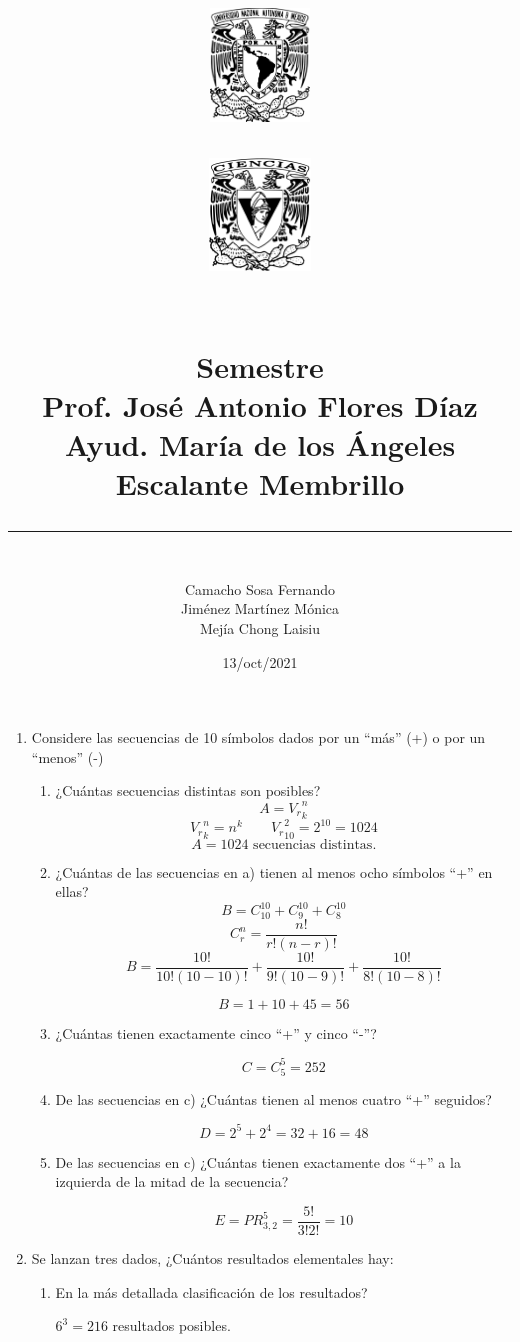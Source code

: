 \documentclass[letterpaper,11pt]{article}
\title{
    \begin{minipage}{0.5\textwidth}%
			\includegraphics[height=3cm, left]{unam.png}%
    \end{minipage}%
    \begin{minipage}{0.5\textwidth}%
			\includegraphics[height=3cm, right]{fciencias.png}%
    \end{minipage}

	\begin{center}
	\vspace{-134pt}
	\textbf{\Materia}\\[0.2cm]
	\large \textbf{ Semestre \Semestre }\\[0.2cm]
	Prof. José Antonio Flores Díaz\\ [0.2cm]													%
	Ayud. María de los Ángeles Escalante Membrillo\\ [0.2cm]													%
	\textbf{\TareaX}
	\end{center}
	\vspace{10pt}
	\rule{17cm}{0.3mm}
	\begin{flushright}
	\vspace{-3pt}
	\end{flushright}
}
\author{\vspace{-2cm} \\Camacho Sosa Fernando\\Jiménez Martínez Mónica\\Mejía Chong Laisiu}
\date{13/oct/2021}
\renewcommand{%
	\contentsname}{\vspace{-1cm} \hfill\bfseries\LARGE Índice \hfill \vspace{0.2cm}%
}
\begin{document}
\maketitle

\begin{enumerate}

\item  Considere las secuencias de 10 símbolos dados por un ``más'' (+) o por un ``menos'' (-)

\begin{enumerate}
	\item ¿Cuántas secuencias distintas son posibles?
	$$
	A= {V_r}_k^n
	$$
	$$
	{V_r}_k^n =n^k \qquad {V_r}_{10}^2= 2^{10} = 1024
	$$
	$$
	A= 1024 \text{ secuencias distintas.}
	$$

	\item ¿Cuántas de las secuencias en a) tienen al menos ocho símbolos ``+'' en ellas?
	$$
	B= C_{10}^{10} + C_{9}^{10} + C_{8}^{10}
	$$
	$$
	C^n_r= \frac{n!}{r!(n-r)!}
	$$
	$$
	B= \frac{10!}{10!(10-10)!} + \frac{10!}{9!(10-9)!} + \frac{10!}{8!(10-8)!} 
	$$
	
	$$
	B= 1+10+45 = 56
	$$

	\item ¿Cuántas tienen exactamente cinco ``+'' y cinco ``-''?
	
	$$
	C = C^5_5 = 252
	$$

	\item De las secuencias en c) ¿Cuántas tienen al menos cuatro ``+'' seguidos?
	
	$$
	D = 2^5 + 2^4 = 32 + 16 = 48
	$$

	\item De las secuencias en c) ¿Cuántas tienen exactamente dos ``+'' a la izquierda de la mitad de la secuencia?
	
	$$
	E = PR^5_{3,2} = \frac{5!}{3!2!} = 10
	$$

\end{enumerate}

\item Se lanzan tres dados, ¿Cuántos resultados elementales hay: 
\begin{enumerate}
	\item En la más detallada clasificación de los resultados?
	
	$6^3 = 216$ resultados posibles. 


\end{enumerate}
\end{enumerate}
\end{document}
